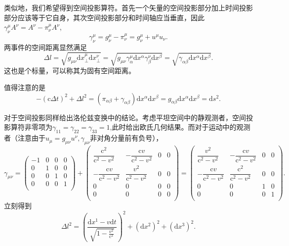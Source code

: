 \documentclass[11pt, a4paper, oneside, onecolumn]{ctexart}
\numberwithin{equation}{subsection}
\begin{document}
类似地，我们希望得到空间投影算符。首先一个矢量的空间投影部分加上时间投影部分应该等于它自身，其次空间投影部分和时间轴应当垂直，因此$\gamma^{\mu}_{\nu}A^{\nu}=A^{\nu}-\pi_{\nu}^{\mu}A^{\nu}$,
\begin{equation}
\gamma^{\mu}_{\nu}=g^{\mu}_{\nu}-\pi^{\mu}_{\nu}=g_{\nu}^{\mu}+u^{\mu}u_{\nu}.
\end{equation}
两事件的空间距离显然满足
\begin{equation}
\Delta{}l=\sqrt{g_{\mu\nu}\mathrm{d}x^{\mu}_{\bot}\mathrm{d}x^{\nu}_{\bot}}=\sqrt{g_{\mu\nu}\gamma^{\mu}_{\alpha}\mathrm{d}x^{\alpha}\gamma^{\nu}_{\beta}\mathrm{d}x^{\beta}}=\sqrt{\gamma_{\alpha\beta}\mathrm{d}x^{\alpha}\mathrm{d}x^{\beta}}.\label{2.1.11}
\end{equation}
这也是个标量，可以称其为固有空间距离。

值得注意的是
\begin{equation}
-\left(\mathrm{c}\Delta{}t\right)^{2}+\Delta{}l^{2}=\left(\pi_{\alpha\beta}+\gamma_{\alpha\beta}\right)\mathrm{d}x^{\alpha}\mathrm{d}x^{\beta}=g_{\alpha\beta}\mathrm{d}x^{\alpha}\mathrm{d}x^{\beta}=\mathrm{d}s^{2}.
\end{equation}

对于空间投影同样给出洛伦兹变换中的结论。考虑平坦空间中的静观测者，空间投影算符非零项为$\gamma_{11}=\gamma_{22}=\gamma_{33}=1$,此时给出欧氏几何结果。而对于运动中的观测者（注意由于$u_{\mu}=g_{\mu\nu}u^{\nu},\gamma_{\mu\nu}$非对角分量前有负号），
\begin{equation}
\gamma_{\mu\nu}=\begin{pmatrix}
-1 & 0 & 0 & 0\\
0 & 1 & 0 & 0\\
0 & 0 & 1 & 0\\
0 & 0 & 0 & 1\\
\end{pmatrix}+
\begin{pmatrix}
\dfrac{\mathrm{c}^{2}}{\mathrm{c}^{2}-v^{2}} & -\dfrac{\mathrm{c}v}{\mathrm{c}^{2}-v^{2}} & 0 & 0\\
-\dfrac{\mathrm{c}v}{\mathrm{c}^{2}-v^{2}} & \dfrac{v^{2}}{\mathrm{c}^{2}-v^{2}} & 0 & 0\\
0 & 0 & 0 & 0\\
0 & 0 & 0 & 0\\
\end{pmatrix}=
\begin{pmatrix}
\dfrac{v^{2}}{\mathrm{c}^{2}-v^{2}} & -\dfrac{\mathrm{c}v}{\mathrm{c}^{2}-v^{2}} & 0 & 0\\
-\dfrac{\mathrm{c}v}{\mathrm{c}^{2}-v^{2}} & \dfrac{\mathrm{c}^{2}}{\mathrm{c}^{2}-v^{2}} & 0 & 0\\
0 & 0 & 1 & 0\\
0 & 0 & 0 & 1\\
\end{pmatrix}.
\end{equation}
立刻得到
\begin{equation}
\Delta{}l^{2}=\left(\frac{\mathrm{d}x^{1}-v\mathrm{d}t}{\sqrt{1-\frac{v^{2}}{\mathrm{c}^{2}}}}\right)^{2}+\left(\mathrm{d}x^{2}\right)^{2}+\left(\mathrm{d}x^{3}\right)^{2}.
\end{equation}
\end{document}
